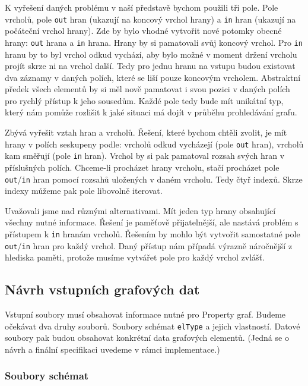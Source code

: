 K vyřešení daných problému v naší představě bychom použili tři pole.
Pole vrcholů, pole \texttt{out} hran (ukazují na koncový vrchol hrany) a \texttt{in} hran (ukazují na počáteční vrchol hrany). 
Zde by bylo vhodné vytvořit nové potomky obecné hrany: \texttt{out} hrana a \texttt{in} hrana.
Hrany by si pamatovali svůj koncový vrchol.
Pro \texttt{in} hranu by to byl vrchol odkud vychází, aby bylo možné v moment držení vrcholu projít skrze ni na vrchol další.
Tedy pro jednu hranu na vstupu budou existovat dva záznamy v daných polích, které se liší pouze koncovým vrcholem.
Abstraktní předek všech elementů by si měl nově pamatovat i svou pozici v daných polích pro rychlý přístup k jeho sousedům.
Každé pole tedy bude mít unikátní typ, který nám pomůže rozlišit k jaké situaci má dojít v průběhu prohledávání grafu.

Zbývá vyřešit vztah hran a vrcholů.
Řešení, které bychom chtěli zvolit, je mít hrany v polích seskupeny podle: vrcholů odkud vycházejí (pole \texttt{out} hran), vrcholů kam směřují (pole \texttt{in} hran).
Vrchol by si pak pamatoval rozsah svých hran v příslušných polích. 
Chceme-li procházet hrany vrcholu, stačí procházet pole \texttt{out}/\texttt{in} hran pomocí rozsahů uložených v daném vrcholu.
Tedy čtyř indexů.
Skrze indexy můžeme pak pole libovolně iterovat.

Uvažovali jsme nad různými alternativami. 
Mít jeden typ hrany obsahující všechny nutné informace.
Řešení je paměťově přijatelnější, ale nastává problém s přístupem k \texttt{in} hranám vrcholů.
Řešením by mohlo být vytvořit samostatné pole \texttt{out}/\texttt{in} hran pro každý vrchol. 
Daný přístup nám případá výrazně náročnější z hlediska paměti, protože musíme vytvářet pole pro každý vrchol zvlášť. 

\subsection{Návrh vstupních grafových dat} \label{anal.vstup}

Vstupní soubory musí obsahovat informace nutné pro Property graf.
Budeme očekávat dva druhy souborů.
Soubory schémat \texttt{elType} a jejich vlastností.
Datové soubory pak budou obsahovat konkrétní data grafových elementů.
(Jedná se o návrh a finální specifikaci uvedeme v rámci implementace.)

\subsubsection{Soubory schémat} 

